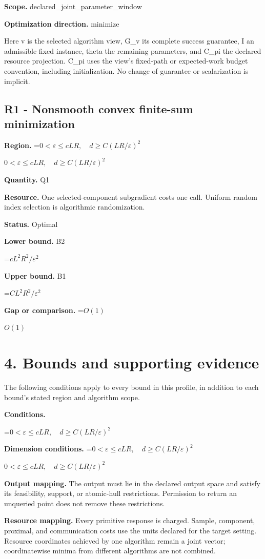 \documentclass[10pt,a4paper]{article}
\newcommand{\AtlasMath}[1]{\par\begingroup\centering\setbox0=\hbox{$\displaystyle #1$}\ifdim\wd0>1.4\linewidth\typeout{ATLAS WIDE FORMULA: \the\wd0}\fi\ifdim\wd0>\linewidth\resizebox{\linewidth}{!}{\box0}\else\box0\fi\par\endgroup}
\newcommand{\AtlasInlineMath}[1]{\begingroup\setbox0=\hbox{$#1$}\ifdim\wd0>.4\linewidth\endgroup\AtlasMath{#1}\else\endgroup$#1$\fi}
\begin{document}
\textbf{Scope.} declared\_joint\_parameter\_window

\textbf{Optimization direction.} minimize

Here v is the selected algorithm view, G\_v its complete success guarantee, I an admissible fixed instance, theta the remaining parameters, and C\_pi the declared resource projection. C\_pi uses the view's fixed-path or expected-work budget convention, including initialization. No change of guarantee or scalarization is implicit.

\subsection{R1 - Nonsmooth convex finite-sum minimization}
\textbf{Region.} \AtlasInlineMath{0<\varepsilon\le cLR,\quad d\ge C(LR/\varepsilon)^2}

\textbf{Quantity.} Q1

\textbf{Resource.} One selected-component subgradient costs one call. Uniform random index selection is algorithmic randomization.

\textbf{Status.} Optimal

\textbf{Lower bound.} B2

\AtlasMath{c L^2R^2/\varepsilon^2}
\textbf{Upper bound.} B1

\AtlasMath{C L^2R^2/\varepsilon^2}
\textbf{Gap or comparison.} \AtlasInlineMath{O(1)}

\section{4. Bounds and supporting evidence}
The following conditions apply to every bound in this profile, in addition to each bound's stated region and algorithm scope.

\textbf{Conditions.} 
\AtlasMath{0<\varepsilon\le cLR,\quad d\ge C(LR/\varepsilon)^2}


\textbf{Dimension conditions.} \AtlasInlineMath{0<\varepsilon\le cLR,\quad d\ge C(LR/\varepsilon)^2}

\textbf{Output mapping.} The output must lie in the declared output space and satisfy its feasibility, support, or atomic-hull restrictions. Permission to return an unqueried point does not remove these restrictions.

\textbf{Resource mapping.} Every primitive response is charged. Sample, component, proximal, and communication costs use the units declared for the target setting. Resource coordinates achieved by one algorithm remain a joint vector; coordinatewise minima from different algorithms are not combined.
\end{document}
